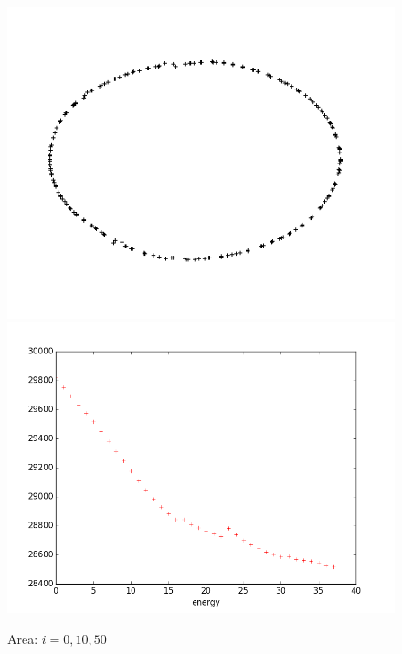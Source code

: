 \documentclass{beamer}
\begin{document}
\begin{frame}[allowframebreaks]
\begin{figure}
        \includegraphics[scale=0.18]{img/ellipse-area-dense-50}
        \includegraphics[scale=0.15]{img/area-dense}
        \caption*{Area: $ i = 0, 10, 50 $}
    \end{figure}


\end{frame}
\end{document}
